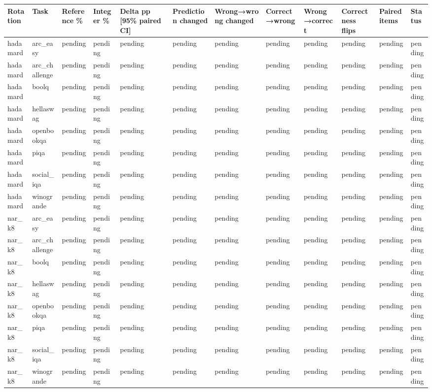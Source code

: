 \begin{tabular}{llllllllllll}
\toprule
Rotation & Task & Reference \% & Integer \% & Delta pp [95\% paired CI] & Prediction changed & Wrong→wrong changed & Correct→wrong & Wrong→correct & Correctness flips & Paired items & Status \\
\midrule
hadamard & arc\_easy & pending & pending & pending & pending & pending & pending & pending & pending & pending & pending \\
hadamard & arc\_challenge & pending & pending & pending & pending & pending & pending & pending & pending & pending & pending \\
hadamard & boolq & pending & pending & pending & pending & pending & pending & pending & pending & pending & pending \\
hadamard & hellaswag & pending & pending & pending & pending & pending & pending & pending & pending & pending & pending \\
hadamard & openbookqa & pending & pending & pending & pending & pending & pending & pending & pending & pending & pending \\
hadamard & piqa & pending & pending & pending & pending & pending & pending & pending & pending & pending & pending \\
hadamard & social\_iqa & pending & pending & pending & pending & pending & pending & pending & pending & pending & pending \\
hadamard & winogrande & pending & pending & pending & pending & pending & pending & pending & pending & pending & pending \\
nar\_k8 & arc\_easy & pending & pending & pending & pending & pending & pending & pending & pending & pending & pending \\
nar\_k8 & arc\_challenge & pending & pending & pending & pending & pending & pending & pending & pending & pending & pending \\
nar\_k8 & boolq & pending & pending & pending & pending & pending & pending & pending & pending & pending & pending \\
nar\_k8 & hellaswag & pending & pending & pending & pending & pending & pending & pending & pending & pending & pending \\
nar\_k8 & openbookqa & pending & pending & pending & pending & pending & pending & pending & pending & pending & pending \\
nar\_k8 & piqa & pending & pending & pending & pending & pending & pending & pending & pending & pending & pending \\
nar\_k8 & social\_iqa & pending & pending & pending & pending & pending & pending & pending & pending & pending & pending \\
nar\_k8 & winogrande & pending & pending & pending & pending & pending & pending & pending & pending & pending & pending \\
\bottomrule
\end{tabular}
